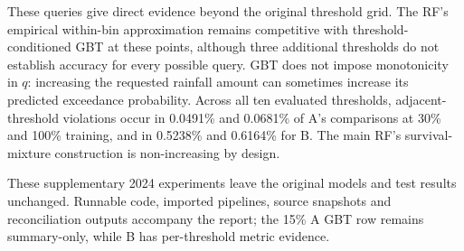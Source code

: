 These queries give direct evidence beyond the original threshold grid. The RF's empirical within-bin approximation remains competitive with threshold-conditioned GBT at these points, although three additional thresholds do not establish accuracy for every possible query. GBT does not impose monotonicity in $q$: increasing the requested rainfall amount can sometimes increase its predicted exceedance probability. Across all ten evaluated thresholds, adjacent-threshold violations occur in 0.0491\% and 0.0681\% of A's comparisons at 30\% and 100\% training, and in 0.5238\% and 0.6164\% for B. The main RF's survival-mixture construction is non-increasing by design.

These supplementary 2024 experiments leave the original models and test results unchanged. Runnable code, imported pipelines, source snapshots and reconciliation outputs accompany the report; the 15\% A GBT row remains summary-only, while B has per-threshold metric evidence.

\clearpage
